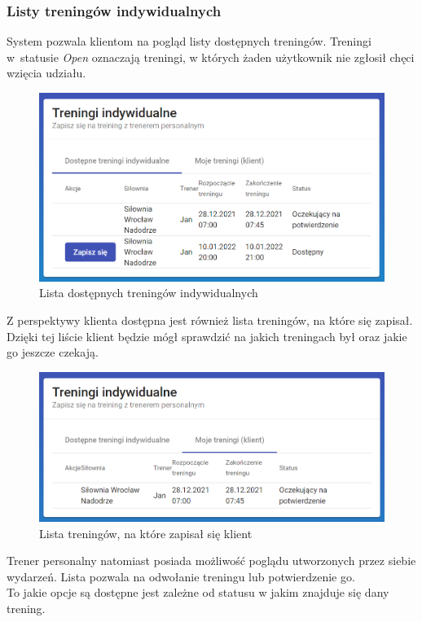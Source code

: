 \documentclass[a4paper,twoside,12pt]{book}
\begin{document}
\subsubsection{Listy treningów indywidualnych}
System pozwala klientom na pogląd listy dostępnych treningów. Treningi w~statusie \textit{Open} oznaczają treningi, w których żaden użytkownik nie zgłosił chęci wzięcia udziału.
\begin{figure}[h!]
	\centering
	\includegraphics[width=1\linewidth]{../zrzuty_ekranu/dzialanie/treningi/klient_dostepne_treningi}
	\caption{Lista dostępnych treningów indywidualnych}
	\label{fig:klientdostepnetreningi}
\end{figure}
\FloatBarrier
Z perspektywy klienta dostępna jest również lista treningów, na które się zapisał. Dzięki tej liście klient będzie mógł sprawdzić na jakich treningach był oraz jakie go jeszcze czekają.
\begin{figure}[h!]
	\centering
	\includegraphics[width=1\linewidth]{../zrzuty_ekranu/dzialanie/treningi/klient_lista_treningow}
	\caption{Lista treningów, na które zapisał się klient}
	\label{fig:klientlistatreningow}
\end{figure}
\FloatBarrier
Trener personalny natomiast posiada możliwość poglądu utworzonych przez siebie wydarzeń. Lista pozwala na odwołanie treningu lub potwierdzenie go.\\To jakie opcje są dostępne jest zależne od statusu w jakim znajduje się dany trening.
\end{document}
